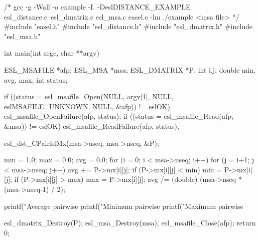 \begin{cchunk}
/* gcc -g -Wall -o example -I. -DeslDISTANCE_EXAMPLE esl_distance.c\
       esl_dmatrix.c esl_msa.c easel.c -lm
   ./example <msa file>
 */
#include "easel.h"
#include "esl_distance.h"
#include "esl_dmatrix.h"
#include "esl_msa.h"

int main(int argc, char **argv)
{
  ESL_MSAFILE  *afp; 
  ESL_MSA      *msa;
  ESL_DMATRIX  *P;
  int           i,j;
  double        min, avg, max;
  int           status;

  if ((status = esl_msafile_Open(NULL, argv[1], NULL, eslMSAFILE_UNKNOWN, NULL, &afp)) != eslOK)
    esl_msafile_OpenFailure(afp, status);
  if ((status = esl_msafile_Read(afp, &msa)) != eslOK)
    esl_msafile_ReadFailure(afp, status);

  esl_dst_CPairIdMx(msa->aseq, msa->nseq, &P);

  min = 1.0;
  max = 0.0;
  avg = 0.0;
  for (i = 0; i < msa->nseq; i++)
    for (j = i+1; j < msa->nseq; j++)
      {
	avg += P->mx[i][j];
	if (P->mx[i][j] < min) min = P->mx[i][j];
	if (P->mx[i][j] > max) max = P->mx[i][j];
      }
  avg /= (double) (msa->nseq * (msa->nseq-1) / 2);

  printf("Average pairwise %
  printf("Minimum pairwise %
  printf("Maximum pairwise %

  esl_dmatrix_Destroy(P);
  esl_msa_Destroy(msa);
  esl_msafile_Close(afp);
  return 0;
}
\end{cchunk}
